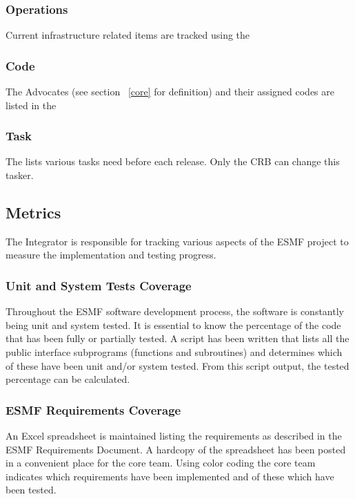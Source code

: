 \subsubsection{Operations}
Current infrastructure related items are tracked using the 

\subsubsection{Code}
The Advocates (see section ~\ref{core} for definition) and their assigned codes are listed
in the 

\subsubsection{Task}
The  lists various tasks need before each release. Only the CRB can change this tasker. 

\subsection{Metrics}

The Integrator is responsible for tracking various aspects of the
ESMF project to measure the implementation and testing progress.
\subsubsection{Unit and System Tests Coverage}
Throughout the ESMF software development process, the software is constantly
being unit and system tested. It is essential to know the percentage of the
code that has been fully or partially tested. A script has been written that 
lists all the public interface subprograms (functions and subroutines) and 
determines which of these have been unit and/or system tested. From this script
output, the tested percentage can be calculated.
\subsubsection{ESMF Requirements Coverage}
An Excel spreadsheet is maintained listing the requirements as described in the
ESMF Requirements Document. A hardcopy of the spreadsheet has been posted in a
convenient place for the core team. Using color coding the core team indicates
which requirements have been implemented and of these which have been tested.
